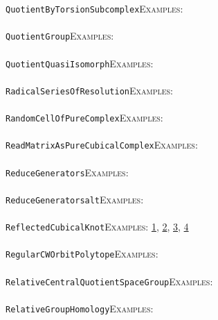 \documentclass[a4paper,11pt]{report}
\begin{document}
{{ \texttt{QuotientByTorsionSubcomplex}{\nobreakspace}{\nobreakspace}{\nobreakspace}{\nobreakspace}\textsc{Examples:} \\
 \\
 \texttt{QuotientGroup}{\nobreakspace}{\nobreakspace}{\nobreakspace}{\nobreakspace}\textsc{Examples:} \\
 \\
 \texttt{QuotientQuasiIsomorph}{\nobreakspace}{\nobreakspace}{\nobreakspace}{\nobreakspace}\textsc{Examples:} \\
 \\
 \texttt{RadicalSeriesOfResolution}{\nobreakspace}{\nobreakspace}{\nobreakspace}{\nobreakspace}\textsc{Examples:} \\
 \\
 \texttt{RandomCellOfPureComplex}{\nobreakspace}{\nobreakspace}{\nobreakspace}{\nobreakspace}\textsc{Examples:} \\
 \\
 \texttt{ReadMatrixAsPureCubicalComplex}{\nobreakspace}{\nobreakspace}{\nobreakspace}{\nobreakspace}\textsc{Examples:} \\
 \\
 \texttt{ReduceGenerators}{\nobreakspace}{\nobreakspace}{\nobreakspace}{\nobreakspace}\textsc{Examples:} \\
 \\
 \texttt{ReduceGenerators{\textunderscore}alt}{\nobreakspace}{\nobreakspace}{\nobreakspace}{\nobreakspace}\textsc{Examples:} \\
 \\
 \texttt{ReflectedCubicalKnot}{\nobreakspace}{\nobreakspace}{\nobreakspace}{\nobreakspace}\textsc{Examples:} \href{tutorial/chap2.html} {1}{\nobreakspace}, \href{tutorial/chap3.html} {2}{\nobreakspace}, \href{tutorial/chap5.html} {3}{\nobreakspace}, \href{../www/SideLinks/About/aboutCoverinSpaces.html} {4}{\nobreakspace} \\
 \\
 \texttt{RegularCWOrbitPolytope}{\nobreakspace}{\nobreakspace}{\nobreakspace}{\nobreakspace}\textsc{Examples:} \\
 \\
 \texttt{RelativeCentralQuotientSpaceGroup}{\nobreakspace}{\nobreakspace}{\nobreakspace}{\nobreakspace}\textsc{Examples:} \\
 \\
 \texttt{RelativeGroupHomology}{\nobreakspace}{\nobreakspace}{\nobreakspace}{\nobreakspace}\textsc{Examples:} \\
 \\
}}
\end{document}
